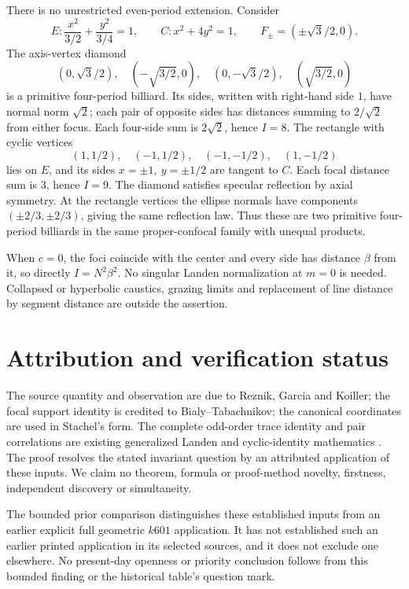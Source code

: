 \documentclass[11pt]{article}
\begin{document}
There is no unrestricted even-period extension. Consider
\[
 E:\frac{x^2}{3/2}+\frac{y^2}{3/4}=1,\qquad
 C:x^2+4y^2=1,\qquad F_\pm=(\pm\sqrt3/2,0).
\]
The axis-vertex diamond
\[
 (0,\sqrt3/2),\quad(-\sqrt{3/2},0),\quad
 (0,-\sqrt3/2),\quad(\sqrt{3/2},0)
\]
is a primitive four-period billiard. Its sides, written with
right-hand side \(1\), have normal norm \(\sqrt2\); each pair of
opposite sides has distances summing to \(2/\sqrt2\) from either
focus. Each four-side sum is \(2\sqrt2\), hence \(I=8\).
The rectangle with cyclic vertices
\[
 (1,1/2),\quad(-1,1/2),\quad(-1,-1/2),\quad(1,-1/2)
\]
lies on \(E\), and its sides \(x=\pm1,\ y=\pm1/2\) are tangent to \(C\).
Each focal distance sum is \(3\), hence \(I=9\).
The diamond satisfies specular reflection by axial symmetry.
At the rectangle vertices the ellipse normals have components
\((\pm2/3,\pm2/3)\), giving the same reflection law.
Thus these are two primitive four-period billiards in the same
proper-confocal family with unequal products.

When \(c=0\), the foci coincide with the center and every side has
distance \(\beta\) from it, so directly \(I=N^2\beta^2\).
No singular Landen normalization at \(m=0\) is needed.
Collapsed or hyperbolic caustics, grazing limits and replacement
of line distance by segment distance are outside the assertion.

\section{Attribution and verification status}

The source quantity and observation are due to Reznik, Garcia and
Koiller; the focal support identity is credited to
Bialy--Tabachnikov; the canonical coordinates are used in Stachel's
form. The complete odd-order trace identity and pair correlations
are existing generalized Landen and cyclic-identity mathematics
\cite{KScyclic,KLScyclic,KSlanden}.
The proof resolves the stated invariant question by an attributed
application of these inputs. We claim no theorem, formula or
proof-method novelty, firstness, independent discovery or simultaneity.

The bounded prior comparison distinguishes these established inputs
from an earlier explicit full geometric \(k601\) application.
It has not established such an earlier printed application in its
selected sources, and it does not exclude one elsewhere.
No present-day openness or priority conclusion follows from this
bounded finding or the historical table's question mark.
\end{document}
